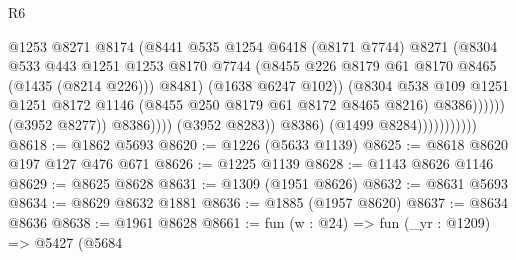 \begin{lexlean}{R6}
\begin{coremodule}
                                                @1253
                                                @8271
                                                @8174
                                                (@8441
                                                  @535
                                                  @1254
                                                  @6418
                                                  (@8171 @7744)
                                                  @8271
                                                  (@8304
                                                    @533
                                                    @443
                                                    @1251
                                                    @1253
                                                    @8170
                                                    @7744
                                                    (@8455
                                                      @226
                                                      @8179
                                                      @61
                                                      @8170
                                                      @8465
                                                      (@1435 (@8214 @226)))
                                                    @8481)
                                                  (@1638 @6247 @102))
                                                (@8304
                                                  @538
                                                  @109
                                                  @1251
                                                  @1251
                                                  @8172
                                                  @1146
                                                  (@8455 @250 @8179 @61 @8172 @8465 @8216)
                                                  @8386))))))
                                      (@3952 @8277))
                                    @8386))))
                            (@3952 @8283))
                          @8386)
                        (@1499 @8284)))))))))))
@8618 := @1862 @5693
@8620 := @1226 (@5633 @1139)
@8625 := @8618 @8620 @197 @127 @476 @671
@8626 := @1225 @1139
@8628 := @1143 @8626 @1146
@8629 := @8625 @8628
@8631 := @1309 (@1951 @8626)
@8632 := @8631 @5693
@8634 := @8629 @8632 @1881
@8636 := @1885 (@1957 @8620)
@8637 := @8634 @8636
@8638 := @1961 @8628
@8661 := fun (w : @24) =>
  fun (_yr : @1209) =>
  @5427
    (@5684

\end{coremodule}
\end{lexlean}
